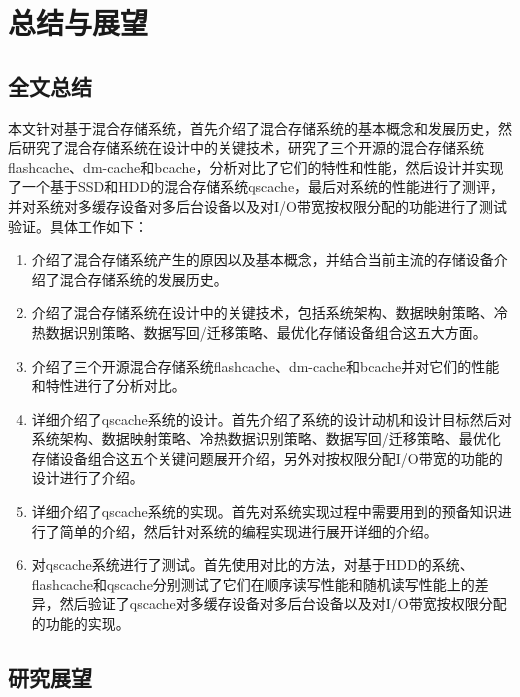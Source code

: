 

\chapter{总结与展望}
\label{chap:summary}

\section{全文总结}

本文针对基于混合存储系统，首先介绍了混合存储系统的基本概念和发展历史，然后研究了混合存储系统在设计中的关键技术，研究了三个开源的混合存储系统flashcache、dm-cache和bcache，分析对比了它们的特性和性能，然后设计并实现了一个基于SSD和HDD的混合存储系统qscache，最后对系统的性能进行了测评，并对系统对多缓存设备对多后台设备以及对I/O带宽按权限分配的功能进行了测试验证。具体工作如下：

\begin{enumerate}
    \item 介绍了混合存储系统产生的原因以及基本概念，并结合当前主流的存储设备介绍了混合存储系统的发展历史。
    \item 介绍了混合存储系统在设计中的关键技术，包括系统架构、数据映射策略、冷热数据识别策略、数据写回/迁移策略、最优化存储设备组合这五大方面。
    \item 介绍了三个开源混合存储系统flashcache、dm-cache和bcache并对它们的性能和特性进行了分析对比。
    \item 详细介绍了qscache系统的设计。首先介绍了系统的设计动机和设计目标然后对系统架构、数据映射策略、冷热数据识别策略、数据写回/迁移策略、最优化存储设备组合这五个关键问题展开介绍，另外对按权限分配I/O带宽的功能的设计进行了介绍。
    \item 详细介绍了qscache系统的实现。首先对系统实现过程中需要用到的预备知识进行了简单的介绍，然后针对系统的编程实现进行展开详细的介绍。
    \item 对qscache系统进行了测试。首先使用对比的方法，对基于HDD的系统、flashcache和qscache分别测试了它们在顺序读写性能和随机读写性能上的差异，然后验证了qscache对多缓存设备对多后台设备以及对I/O带宽按权限分配的功能的实现。
\end{enumerate}

\section{研究展望}

